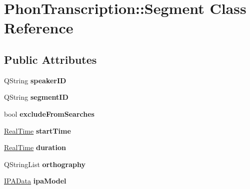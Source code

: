 \hypertarget{class_phon_transcription_1_1_segment}{}\section{Phon\+Transcription\+:\+:Segment Class Reference}
\label{class_phon_transcription_1_1_segment}
\subsection*{Public Attributes}
\begin{DoxyCompactItemize}
\item 
\mbox{\label{class_phon_transcription_1_1_segment_a062243cfa7acb95883bd8c9127322ff3}} 
Q\+String {\bfseries speaker\+ID}
\item 
\mbox{\label{class_phon_transcription_1_1_segment_a0181875d90a9324409b98f6721e22961}} 
Q\+String {\bfseries segment\+ID}
\item 
\mbox{\label{class_phon_transcription_1_1_segment_a608854c12dc59a300e16691c53128cdc}} 
bool {\bfseries exclude\+From\+Searches}
\item 
\mbox{\label{class_phon_transcription_1_1_segment_a6b1b60e975f71cf2c54075897a92e06f}} 
\hyperlink{struct_real_time}{Real\+Time} {\bfseries start\+Time}
\item 
\mbox{\label{class_phon_transcription_1_1_segment_a8ddf2b81d4aaf643939b23376706c105}} 
\hyperlink{struct_real_time}{Real\+Time} {\bfseries duration}
\item 
\mbox{\label{class_phon_transcription_1_1_segment_a62cfd1a12478234f0ed7e5073aa8ad38}} 
Q\+String\+List {\bfseries orthography}
\item 
\mbox{\label{class_phon_transcription_1_1_segment_abdb4e055ec4db9fccf3805db808d341f}} 
\hyperlink{class_phon_transcription_1_1_i_p_a_data}{I\+P\+A\+Data} {\bfseries ipa\+Model}
\item 
\mbox{\label{class_phon_transcription_1_1_segment_adc4f760e11e1eab83f2aad4672b60984}} 

\end{DoxyCompactItemize}
